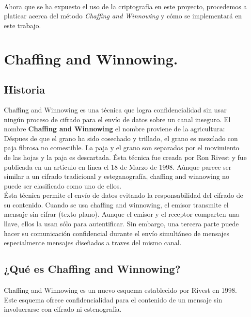 \documentclass[12pt, a4paper, titlepage]{report}
\begin{document}
	    \paragraph{}
	    Ahora que se ha expuesto el uso de la criptografía en este proyecto, procedemos a platicar acerca del método \textit{Chaffing and Winnowing} y cómo se implementará en este trabajo.
	   
	    \section{Chaffing and Winnowing.}
	    \subsection{Historia}
	    Chaffing and Winnowing es una técnica que logra confidencialidad sin usar ning\'un proceso de cifrado para el env\'io de datos sobre un canal inseguro. El nombre \textbf{Chaffing and Winnowing} el nombre proviene de la agricultura: D\'espues de que el grano ha sido cosechado y trillado, el grano es mezclado con paja fibrosa no comestible. La paja y el grano son separados por el movimiento de las hojas y la paja es descartada.
	    \'Esta t\'ecnica fue creada por Ron Rivest y fue publicada en un articulo en l\'inea el 18 de Marzo de 1998. \cite{refRivestMIT}
	    A\'unque parece ser similar a un cifrado tradicional y esteganograf\'ia, chaffing and winnowing no puede ser clasificado como uno de ellos.\\
	    \'Esta t\'ecnica permite el env\'io de datos evitando la responsabilidad del cifrado de su contenido. Cuando se usa chaffing and winnowing, el emisor transmite el mensaje sin cifrar (texto plano). Aunque el emisor y el receptor comparten una llave, ellos la usan s\'olo para autentificar. Sin embargo, una tercera parte puede hacer su comunicaci\'on confidencial durante el env\'io simult\'aneo de mensajes especialmente mensajes diseñados a traves del mismo canal.
	    
	    \subsection{¿Qu\'e es Chaffing and Winnowing?}
	    
	    \paragraph{}
	        Chaffing and Winnowing es un nuevo esquema establecido por Rivest en 1998. Este esquema ofrece confidencialidad para el contenido de un mensaje sin involucrarse con cifrado ni estenografía. \cite{refChaffing}
	    
\end{document}
